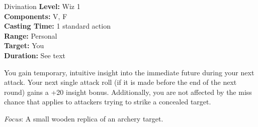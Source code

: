 {Divination}
{
	\textbf{Level:}
	Wiz 1\\
	\textbf{Components:}
	V, F\\
	\textbf{Casting Time:}
	1 standard action\\
	\textbf{Range:}
	Personal\\
	\textbf{Target:}
	You\\
	\textbf{Duration:}
	See text\\
}
{
	You gain temporary, intuitive insight into the immediate future during your next attack. Your next single attack roll (if it is made before the end of the next round) gains a +20 insight bonus. Additionally, you are not affected by the miss chance that applies to attackers trying to strike a concealed target.

	\textit{Focus}:
	A small wooden replica of an archery target.

}
